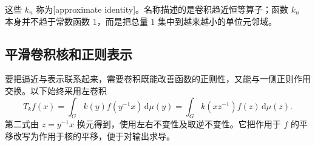 这些 \(k_n\) 称为[approximate identity]。名称描述的是卷积趋近恒等算子；函数 \(k_n\) 本身并不趋于常数函数 \(1\)，而是把总量 \(1\) 集中到越来越小的单位元邻域。

\subsection{平滑卷积核和正则表示}
\label{g1:subsec:2002:02}
要把逼近与表示联系起来，需要卷积既能改善函数的正则性，又能与一侧正则作用交换。以下始终采用左卷积
\begin{equation}\label{g1:eq:left-convolution-kernel}
	T_kf(x)=\int_Gk(y)f(y^{-1}x)\,\mathrm{d}\mu(y)
	=\int_Gk(xz^{-1})f(z)\,\mathrm{d}\mu(z).
\end{equation}
第二式由 \(z=y^{-1}x\) 换元得到，使用左右不变性及取逆不变性。它把作用于 \(f\) 的平移改写为作用于核的平移，便于对输出求导。

